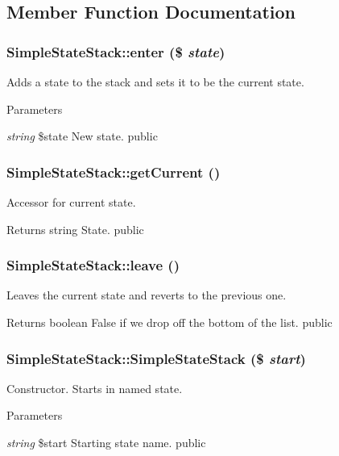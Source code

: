 \subsection{Member Function Documentation}
\hypertarget{class_simple_state_stack_afea48ccdd072d556d9bd7eb9641e35bb}{
\subsubsection[{enter}]{\setlength{\rightskip}{0pt plus 5cm}SimpleStateStack::enter (\$ {\em state})}}
\label{class_simple_state_stack_afea48ccdd072d556d9bd7eb9641e35bb}
Adds a state to the stack and sets it to be the current state. 
\begin{DoxyParams}{Parameters}
\item[{\em string}]\$state New state.  public \end{DoxyParams}
\hypertarget{class_simple_state_stack_a458c1edc7ee2628b74fb73a207952462}{
\subsubsection[{getCurrent}]{\setlength{\rightskip}{0pt plus 5cm}SimpleStateStack::getCurrent ()}}
\label{class_simple_state_stack_a458c1edc7ee2628b74fb73a207952462}
Accessor for current state. \begin{DoxyReturn}{Returns}
string State.  public 
\end{DoxyReturn}
\hypertarget{class_simple_state_stack_a135b1517ac49eb6bdbcecf009c86a077}{
\subsubsection[{leave}]{\setlength{\rightskip}{0pt plus 5cm}SimpleStateStack::leave ()}}
\label{class_simple_state_stack_a135b1517ac49eb6bdbcecf009c86a077}
Leaves the current state and reverts to the previous one. \begin{DoxyReturn}{Returns}
boolean False if we drop off the bottom of the list.  public 
\end{DoxyReturn}
\hypertarget{class_simple_state_stack_a223dbdb698b604ae03f8cd7e330ec637}{
\subsubsection[{SimpleStateStack}]{\setlength{\rightskip}{0pt plus 5cm}SimpleStateStack::SimpleStateStack (\$ {\em start})}}
\label{class_simple_state_stack_a223dbdb698b604ae03f8cd7e330ec637}
Constructor. Starts in named state. 
\begin{DoxyParams}{Parameters}
\item[{\em string}]\$start Starting state name.  public \end{DoxyParams}


